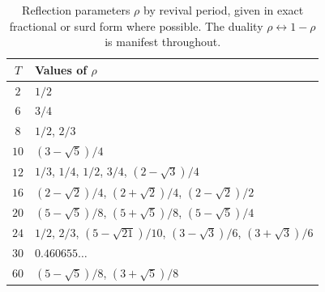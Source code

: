 \begin{table}[htbp]
\centering
\caption{Reflection parameters $\rho$ by revival period, given in
exact fractional or surd form where possible. The duality
$\rho \leftrightarrow 1-\rho$ is manifest throughout.}
\label{tab:rho-by-period}
\begin{tabular}{cl}
\toprule
$T$ & Values of $\rho$ \\
\midrule
$2$  & $1/2$ \\
$6$  & $3/4$ \\
$8$  & $1/2$, $2/3$ \\
$10$ & $(3-\sqrt{5})/4$ \\
$12$ & $1/3$, $1/4$, $1/2$, $3/4$, $(2-\sqrt{3})/4$ \\
$16$ & $(2-\sqrt{2})/4$, $(2+\sqrt{2})/4$, $(2-\sqrt{2})/2$ \\
$20$ & $(5-\sqrt{5})/8$, $(5+\sqrt{5})/8$, $(5-\sqrt{5})/4$ \\
$24$ & $1/2$, $2/3$, $(5-\sqrt{21})/10$, $(3-\sqrt{3})/6$, $(3+\sqrt{3})/6$ \\
$30$ & $0.460655\ldots$ \\
$60$ & $(5-\sqrt{5})/8$, $(3+\sqrt{5})/8$ \\
\bottomrule
\end{tabular}
\end{table}
